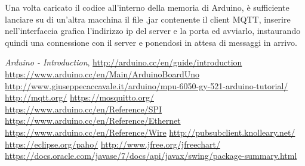 \documentclass[]{scrartcl}
\begin{document}
Una volta caricato il codice all'interno della memoria di Arduino, è sufficiente lanciare su di un'altra macchina il file .jar contenente il client MQTT, inserire nell'interfaccia grafica l'indirizzo ip del server e la porta ed avviarlo, instaurando quindi una connessione con il server e ponendosi in attesa di messaggi in arrivo.
\newpage
\begin{thebibliography}{argomento}

 \emph{Arduino - Introduction}, \url{http://arduino.cc/en/guide/introduction}
 \url{https://www.arduino.cc/en/Main/ArduinoBoardUno}
 \url{http://www.giuseppecaccavale.it/arduino/mpu-6050-gy-521-arduino-tutorial/}
 \url{http://mqtt.org/}
 \url{https://mosquitto.org/}
 \url{https://www.arduino.cc/en/Reference/SPI}
 \url{https://www.arduino.cc/en/Reference/Ethernet}
 \url{https://www.arduino.cc/en/Reference/Wire}
 \url{http://pubsubclient.knolleary.net/}
 \url{https://eclipse.org/paho/}
 \url{http://www.jfree.org/jfreechart/}
 \url{https://docs.oracle.com/javase/7/docs/api/javax/swing/package-summary.html}
\end{thebibliography}
\end{document}
